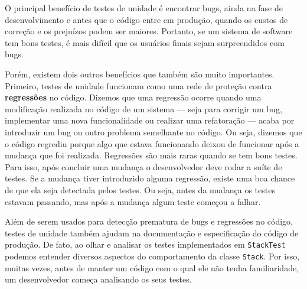 \documentclass[
  11pt,
  twoside]{book}
\newcommand{\passthrough}[1]{#1}
\begin{document}
O principal benefício de testes de unidade é encontrar bugs, ainda na
fase de desenvolvimento e antes que o código entre em produção, quando
os custos de correção e os prejuízos podem ser maiores. Portanto, se um
sistema de software tem bons testes, é mais difícil que os usuários
finais sejam surpreendidos com bugs.

 Porém, existem dois outros
benefícios que também são muito importantes. Primeiro, testes de unidade
funcionam como uma rede de proteção contra \textbf{regressões} no
código. Dizemos que uma regressão ocorre quando uma modificação
realizada no código de um sistema --- seja para corrigir um bug,
implementar uma nova funcionalidade ou realizar uma refatoração ---
acaba por introduzir um bug ou outro problema semelhante no código. Ou
seja, dizemos que o código regrediu porque algo que estava funcionando
deixou de funcionar após a mudança que foi realizada. Regressões são
mais raras quando se tem bons testes. Para isso, após concluir uma
mudança o desenvolvedor deve rodar a suíte de testes. Se a mudança tiver
introduzido alguma regressão, existe uma boa chance de que ela seja
detectada pelos testes. Ou seja, antes da mudança os testes estavam
passando, mas após a mudança algum teste começou a falhar.

Além de serem usados para detecção prematura de bugs e regressões no
código, testes de unidade também ajudam na documentação e especificação
do código de produção. De fato, ao olhar e analisar os testes
implementados em \passthrough{\lstinline!StackTest!} podemos entender
diversos aspectos do comportamento da classe
\passthrough{\lstinline!Stack!}. Por isso, muitas vezes, antes de manter
um código com o qual ele não tenha familiaridade, um desenvolvedor
começa analisando os seus testes.

 
\end{document}
